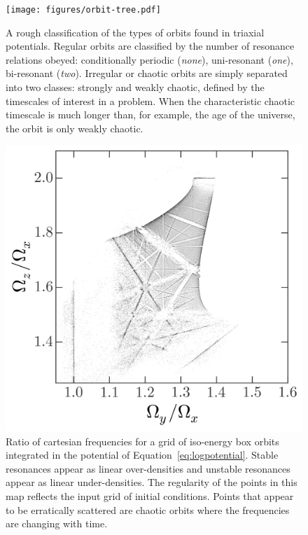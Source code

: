 \documentclass[letterpaper,12pt,preprint]{aastex}
\begin{document}
\begin{figure}[!p]
\begin{center}
\texttt{[image: figures/orbit-tree.pdf]}
\caption{A rough classification of the types of orbits found in triaxial potentials. Regular orbits are classified by the number of resonance relations obeyed: conditionally periodic (\emph{none}), uni-resonant (\emph{one}), bi-resonant (\emph{two}). Irregular or chaotic orbits are simply separated into two classes: strongly and weakly chaotic, defined by the timescales of interest in a problem. When the characteristic chaotic timescale is much longer than, for example, the age of the universe, the orbit is only weakly chaotic. } \label{fig:orbit-tree}
\end{center}
\end{figure}

\begin{figure}[p]
\begin{center}
\includegraphics[width=\textwidth]{figures/log-freqmap.png}
\caption{Ratio of cartesian frequencies for a grid of iso-energy box orbits integrated in the potential of Equation~\ref{eq:logpotential}. Stable resonances appear as linear over-densities and unstable resonances appear as linear under-densities. The regularity of the points in this map reflects the input grid of initial conditions. Points that appear to be erratically scattered are chaotic orbits where the frequencies are changing with time.} \label{fig:logfreqs}
\end{center}
\end{figure}
\end{document}
